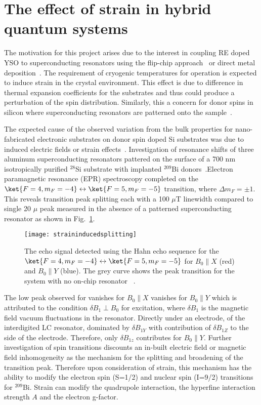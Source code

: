 \section{The effect of strain in hybrid quantum systems}
The motivation for this project arises due to the interest in coupling RE doped YSO to superconducting resonators using the flip-chip approach~\citep{PhysRevLett.110.157001} or direct metal deposition~\citep{doi:10.1063/1.4894455}. The requirement of cryogenic temperatures for operation is expected to induce strain in the crystal environment. This effect is due to difference in thermal expansion coefficients for the substrates and thus could produce a perturbation of the spin distribution. Similarly, this a concern for donor spins in silicon where superconducting resonators are patterned onto the sample~\citep{doi:10.1063/1.4919761}. 

The expected cause of the observed variation from the bulk properties for nano-fabricated electronic substrates on donor spin doped Si substrates was due to induced electric fields or strain effects~\citep{10.1038/NNANO.2014.211}. Investigation of resonance shifts of three aluminum superconducting resonators pattered on the surface of a 700 nm isotropically purified $^{28}$Si substrate with implanted $^{209}$Bi donors~\citep{PhysRevApplied.9.044014}.Electron paramagnetic resonance (EPR) spectroscopy completed on the $\ket{F=4,m_{F}=-4} \leftrightarrow \ket{F=5,m_{F}=-5}$ transition, where $\Delta m_{F} = \pm 1$. This reveals transition peak splitting each with a 100 $\mu$T linewidth compared to single 20 $\mu$ peak measured in the absence of a patterned superconducting resonator as shown in Fig.~\ref{fig:straininducedsplitting}. 


\begin{figure}[h]
\centering
\texttt{[image: straininducedsplitting]}
\caption{\label{fig:straininducedsplitting} The echo signal detected using the Hahn echo sequence for the $\ket{F=4,m_{F}=-4} \leftrightarrow \ket{F=5,m_{F}=-5}$ for $B_{0} \parallel X$ (red) and $B_{0} \parallel Y$ (blue). The grey curve shows the peak transition for the system with no on-chip resonator ~\citep{PhysRevApplied.9.044014}.}
\end{figure}


The low peak observed for  vanishes for $B_{0} \parallel X$ vanishes for $B_{0} \parallel Y$ which is attributed to the condition $\delta B_{1}\perp B_{0}$ for excitation, where $\delta B_{1}$ is the magnetic field vacuum fluctuations in the resonator. Directly under an electrode, of the interdigited LC resonator, dominated by $\delta B_{1Y}$ with contribution of $\delta B_{1Z}$ to the side of the electrode. Therefore, only $\delta B_{1z}$ contributes for $B_{0} \parallel Y$. Further investigation of spin transitions discounts an in-built electric field or magnetic field inhomogeneity as the mechanism for the splitting and broadening of the transition peak. Therefore upon consideration of strain, this mechanism has the ability to modify the electron spin (S=1/2) and nuclear spin (I=9/2) transitions for $^{209}$Bi. Strain can modify the quadrupole interaction, the hyperfine interaction strength $A$ and the electron g-factor.   

